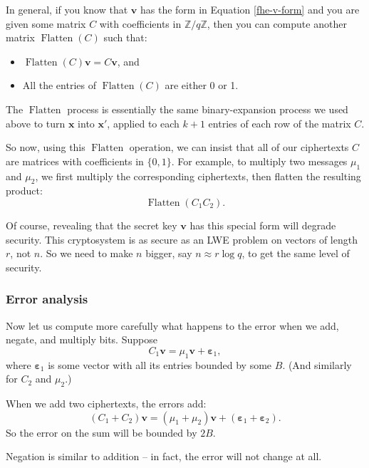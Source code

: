 In general, if you know that \(\mathbf{v}\) has the form in
Equation \eqref{fhe-v-form} and you are given some matrix
\(C\) with coefficients in \({\mathbb{Z}}/q{\mathbb{Z}}\), then you can
compute another matrix \(\operatorname{Flatten}(C)\) such that:

\begin{itemize}
\item
  \(\operatorname{Flatten}(C)\mathbf{v} = C\mathbf{v}\), and
\item
  All the entries of \(\operatorname{Flatten}(C)\) are either 0 or 1.
\end{itemize}

The \(\operatorname{Flatten}\) process is essentially the same binary-expansion
process we used above to turn \(\mathbf{x}\) into \(\mathbf{x}'\),
applied to each \(k + 1\) entries of each row of the matrix \(C\).

So now, using this \(\operatorname{Flatten}\) operation, we can insist that all
of our ciphertexts \(C\) are matrices with coefficients in
\(\{ 0,1 \}\). For example, to multiply two messages
\(\mu_{1}\) and \(\mu_{2}\), we first multiply the corresponding
ciphertexts, then flatten the resulting product:
\[\operatorname{Flatten}( C_{1}C_{2} ).\]

Of course, revealing that the secret key \(\mathbf{v}\) has this special
form will degrade security. This cryptosystem is as secure as an LWE
problem on vectors of length \(r\), not \(n\). So we need to make \(n\)
bigger, say \(n \approx r\log q\), to get the same level of security.

\subsubsection{Error analysis}\label{error-analysis}

Now let us compute more carefully what happens to the error when we add,
negate, and multiply bits. Suppose
\[C_{1}\mathbf{v} = \mu_{1}\mathbf{v} + \mathbf{\varepsilon}_{1},\]
where \(\mathbf{\varepsilon}_{1}\) is some vector with all its entries
bounded by some \(B\). (And similarly for \(C_{2}\) and \(\mu_{2}\).)

When we add two ciphertexts, the errors add:
\[( C_{1} + C_{2} )\mathbf{v} = ( \mu_{1} + \mu_{2} )\mathbf{v} + ( \mathbf{\varepsilon}_{1} + \mathbf{\varepsilon}_{2} ).\]
So the error on the sum will be bounded by \(2B\).

Negation is similar to addition -- in fact, the error will not change at
all.

